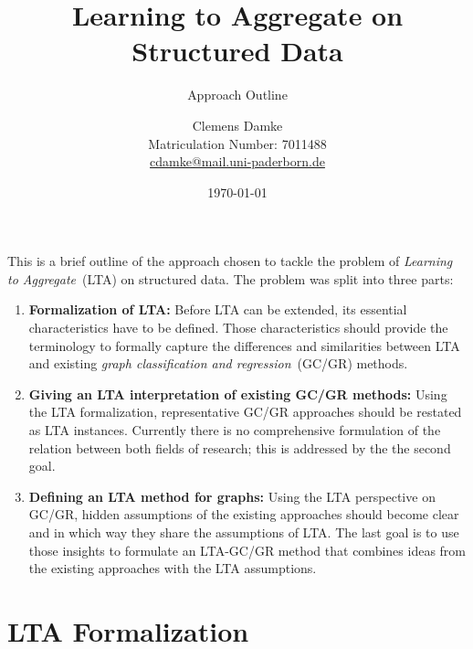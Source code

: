 \documentclass[12pt]{scrartcl}
\makeatletter
\newcommand{\thesisTitle}{Learning to Aggregate on Structured Data}
\newcommand{\thesisSubject}{Approach Outline}
\newcommand{\thesisName}{Clemens Damke}
\newcommand{\thesisMail}{cdamke@mail.uni-paderborn.de}
\newcommand{\thesisMatNr}{7011488}
\makeatother
\begin{document}
\title{\thesisTitle}
\subtitle{\thesisSubject}
\author{{\thesisName}\\\small{Matriculation Number: \thesisMatNr}\\\small{\href{mailto:\thesisMail}{\thesisMail}}}
\date{\today}
\maketitle

This is a brief outline of the approach chosen to tackle the problem of \textit{Learning to Aggregate}~(LTA) on structured data.
The problem was split into three parts:
\begin{enumerate}[label=\textbf{\arabic*.}]
	\item \textbf{Formalization of LTA:}
		Before LTA can be extended, its essential characteristics have to be defined.
		Those characteristics should provide the terminology to formally capture the differences and similarities between LTA and existing \textit{graph classification and regression}~(GC/GR) methods.
	\item \textbf{Giving an LTA interpretation of existing GC/GR methods:}
		Using the LTA formalization, representative GC/GR approaches should be restated as LTA instances.
		Currently there is no comprehensive formulation of the relation between both fields of research;
		this is addressed by the the second goal.
	\item \textbf{Defining an LTA method for graphs:}
		Using the LTA perspective on GC/GR, hidden assumptions of the existing approaches should become clear and in which way they share the assumptions of LTA.\@
		The last goal is to use those insights to formulate an LTA-GC/GR method that combines ideas from the existing approaches with the LTA assumptions.
\end{enumerate}

\section{LTA Formalization}%
\label{sec:lta}
\end{document}
